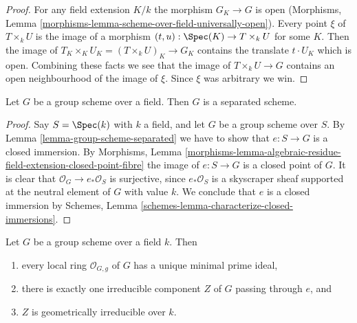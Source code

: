 \begin{proof}
For any field extension $K/k$ the morphism $G_K \to G$ is open
(Morphisms, Lemma \ref{morphisms-lemma-scheme-over-field-universally-open}).
Every point $\xi$ of $T \times_k U$ is the image of a morphism
$(t, u) : \Spec(K) \to T \times_k U$ for some $K$. Then the image of
$T_K \times_K U_K = (T \times_k U)_K \to G_K$ contains the translate
$t \cdot U_K$ which is open. Combining these facts we see that the
image of $T \times_k U \to G$ contains an open neighbourhood of
the image of $\xi$. Since $\xi$ was arbitrary we win.
\end{proof}

\begin{lemma}
\label{lemma-group-scheme-over-field-separated}
Let $G$ be a group scheme over a field.
Then $G$ is a separated scheme.
\end{lemma}

\begin{proof}
Say $S = \Spec(k)$ with $k$ a field, and let $G$ be a group scheme
over $S$. By
Lemma \ref{lemma-group-scheme-separated}
we have to show that $e : S \to G$ is a closed immersion. By
Morphisms, Lemma
\ref{morphisms-lemma-algebraic-residue-field-extension-closed-point-fibre}
the image of $e : S \to G$ is a closed point of $G$.
It is clear that $\mathcal{O}_G \to e_*\mathcal{O}_S$ is surjective,
since $e_*\mathcal{O}_S$ is a skyscraper sheaf supported at the neutral
element of $G$ with value $k$. We conclude that $e$ is a closed immersion by
Schemes, Lemma \ref{schemes-lemma-characterize-closed-immersions}.
\end{proof}

\begin{lemma}
\label{lemma-group-scheme-field-geometrically-irreducible}
Let $G$ be a group scheme over a field $k$.
Then
\begin{enumerate}
\item every local ring $\mathcal{O}_{G, g}$ of $G$ has a unique
minimal prime ideal,
\item there is exactly one irreducible component $Z$ of $G$
passing through $e$, and
\item $Z$ is geometrically irreducible over $k$.
\end{enumerate}
\end{lemma}

